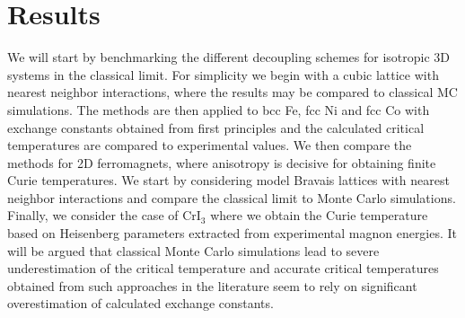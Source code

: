 \documentclass[aps,prb,reprint,floatfix,superscriptaddress]{revtex4-2}
\begin{document}
\section{Results}\label{sec:results}
We will start by benchmarking the different decoupling schemes for isotropic 3D systems in the classical limit. For simplicity we begin with a cubic lattice with nearest neighbor interactions, where the results may be compared to classical MC simulations. The methods are then applied to bcc Fe, fcc Ni and fcc Co with exchange constants obtained from first principles and the calculated critical temperatures are compared to experimental values. We then compare the methods for 2D ferromagnets, where anisotropy is decisive for obtaining finite Curie temperatures. We start by considering model Bravais lattices with nearest neighbor interactions and compare the classical limit to Monte Carlo simulations. Finally, we consider the case of CrI$_3$ where we obtain the Curie temperature based on Heisenberg parameters extracted from experimental magnon energies. It will be argued that classical Monte Carlo simulations lead to severe underestimation of the critical temperature and accurate critical temperatures obtained from such approaches in the literature seem to rely on significant overestimation of calculated exchange constants.
\end{document}
